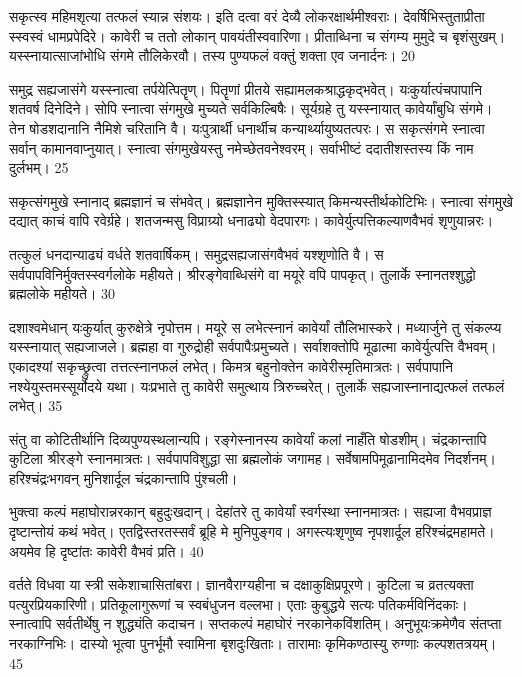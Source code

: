 सकृत्स्व महिमशृत्या तत्फलं स्यान्न संशयः।
 इति दत्वा वरं देव्यै लोकरक्षार्थमीश्वराः।
 देवर्षिभिस्तुताप्रीता स्स्वस्वं धामप्रपेदिरे।
 कावेरी च ततो लोकान् पावयंतीस्ववारिणा।
 प्रीताब्धिना च संगम्य मुमुदे च बृशंसुखम्।
 यस्स्नायात्साजांभोधि संगमे तौलिकेरवौ।
 तस्य पुण्यफलं वक्तुं शक्ता एव जनार्दनः।
 20

  समुद्र सह्यजासंगे यस्स्नात्वा तर्पयेत्पितॄण्।
 पितॄणां प्रीतये सह्यामलकश्राद्धकृद्भवेत्।
 यःकुर्यात्पंचपापानि शतवर्ष दिनेदिने।
 सोपि स्नात्वा संगमुखे मुच्यते सर्वकिल्बिषैः।
 सूर्यग्रहे तु यस्स्नायात् कावेर्यांबुधि संगमे।
 तेन षोडशदानानि नैमिशे चरितानि वै।
 यःपुत्रार्थी धनार्थीच कन्यार्थ्यायुष्यतत्परः।
 स सकृत्संगमे स्नात्वा सर्वान् कामानवाप्नुयात्।
 स्नात्वा संगमुखेयस्तु नमेच्छेतवनेश्वरम्।
 सर्वाभीष्टं ददातीशस्तस्य किं नाम दुर्लभम्।
 25

  सकृत्संगमुखे स्नानाद् ब्रह्मज्ञानं च संभवेत्।
 ब्रह्मज्ञानेन मुक्तिस्स्यात् किमन्यस्तीर्थकोटिभिः।
 स्नात्वा संगमुखे दद्यात् काचं वापि रवेर्ग्रहे।
 शतजन्मसु विप्राग्र्यो धनाढ्यो वेदपारगः।
 कावेर्युत्पत्तिकल्याणवैभवं शृणुयान्नरः।
 
तत्कुलं धनदान्याढ्यं वर्धते शतवार्षिकम्।
 समुद्रसह्यजासंगवैभवं यश्शृणोति वै।
 स सर्वपापविनिर्मुक्तस्स्वर्गलोके महीयते।
 श्रीरङ्गेवाब्धिसंगे वा मयूरे वपि पापकृत्।
 तुलार्के स्नानतश्शुद्धो ब्रह्मलोके महीयते।
 30

  दशाश्वमेधान् यःकुर्यात् कुरुक्षेत्रे नृपोत्तम।
 मयूरे स लभेत्स्नानं कावेर्यां तौलिभास्करे।
 मध्यार्जुने तु संकल्प्य यस्स्नायात् सह्यजाजले।
 ब्रह्महा वा गुरुद्रोही सर्वपापैःप्रमुच्यते।
 सर्वाशक्तोपि मूढात्मा कावेर्युत्पत्ति वैभवम्।
 एकादश्यां सकृच्छ्रुत्वा तत्तत्स्नानफलं लभेत्।
 किमत्र बहुनोक्तेन कावेरीस्मृतिमात्रतः।
 सर्वपापानि नश्येयुस्तमस्सूर्योदये यथा।
 यःप्रभाते तु कावेरी समुत्थाय त्रिरुच्चरेत्।
 तुलार्के सह्यजास्नानाद्यत्फलं तत्फलं लभेत्।
 35

  संतु वा कोटितीर्थानि दिव्यपुण्यस्थलान्यपि।
 रङ्गेस्नानस्य कावेर्यां कलां नाहँति षोडशीम्।
 चंद्रकान्तापि कुटिला श्रीरङ्गे स्नानमात्रतः।
 सर्वपापविशुद्धा सा ब्रह्मलोकं जगामह।
 सर्वेषामपिमूढानामिदमेव निदर्शनम्।
 हरिश्चंद्रःभगवन् मुनिशार्दूल चंद्रकान्तापि पुंश्चली।
 
भुक्त्वा कल्पं महाघोरान्नरकान् बहुदुःखदान्।
 देहांतरे तु कावेर्यां स्वर्गस्था स्नानमात्रतः।
 सह्यजा वैभवप्राज्ञ दृष्टान्तोयं कथं भवेत्।
 एतद्विस्तरतस्सर्वं ब्रूहि मे मुनिपुङ्गव।
 अगस्त्यःशृणुष्व नृपशार्दूल हरिश्चंद्रमहामते।
 अयमेव हि दृष्टांतः कावेरी वैभवं प्रति।
 40

  वर्तते विधवा या स्त्री सकेशाचासितांबरा।
 ज्ञानवैराग्यहीना च दक्षाकुक्षिप्रपूरणे।
 कुटिला च व्रतत्यक्ता पत्युरप्रियकारिणी।
 प्रतिकूलागुरूणां च स्वबंधुजन वल्लभा।
 एताः कुबुद्धये सत्यः पतिकर्मविनिंदकाः।
 स्नात्वापि सर्वतीर्थेषु न शुद्ध्यंति कदाचन।
 सप्तकल्पं महाघोरं नरकानेकविंशतिम्।
 अनुभूयःक्रमेणैव संतप्ता नरकाग्निभिः।
 दास्यो भूत्वा पुनर्भूमौ स्वामिना बृशदुःखिताः।
 तारामाः कृमिकण्ठास्यु रुग्णाः कल्पशतत्रयम्।
 45

